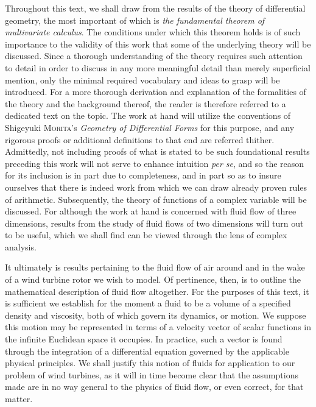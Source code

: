 Throughout this text, we shall draw from the results of the theory of differential geometry, the most important of which is \emph{the fundamental theorem of multivariate calculus}.
The conditions under which this theorem holds is of such importance to the validity of this work that some of the underlying theory will be discussed.
Since a thorough understanding of the theory requires such attention to detail in order to discuss in any more meaningful detail than merely superficial mention, only the minimal required vocabulary and ideas to grasp  will be introduced.
For a more thorough derivation and explanation of the formalities of the theory and the background thereof, the reader is therefore referred to a dedicated text on the topic.
The work at hand will utilize the conventions of Shigeyuki \textsc{Morita}'s \emph{Geometry of Differential Forms} for this purpose, and any rigorous proofs or additional definitions to that end are referred thither.
Admittedly, not including proofs of what is stated to be such foundational results preceding this work will not serve to enhance intuition \emph{per se}, and so the reason for its inclusion is in part due to completeness, and in part so as to insure ourselves that there is indeed work from which we can draw already proven rules of arithmetic.
Subsequently, the theory of functions of a complex variable will be discussed.
For although the work at hand is concerned with fluid flow of three dimensions, results from the study of fluid flows of two dimensions will turn out to be useful, which we shall find can be viewed through the lens of complex analysis.

It ultimately is results pertaining to the fluid flow of air around and in the wake of a wind turbine rotor we wish to model.
Of pertinence, then, is to outline the mathematical description of fluid flow altogether.
For the purposes of this text, it is sufficient we establish for the moment a fluid to be a volume of a specified density and viscosity, both of which govern its dynamics, or motion.
We suppose this motion may be represented in terms of a velocity vector of scalar functions in the infinite Euclidean space it occupies.
In practice, such a vector is found through the integration of a differential equation governed by the applicable physical principles.
We shall justify this notion of fluids for application to our problem of wind turbines, as it will in time become clear that the assumptions made are in no way general to the physics of fluid flow, or even correct, for that matter.

